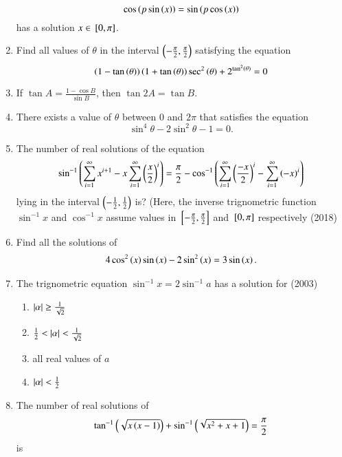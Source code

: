 \begin{enumerate}[label=\thesubsection.\arabic*,ref=\thesubsection.\theenumi]
$$
\cos {\ensuremath{\left(p\sin \left(x\right)\right)}}=\sin {\ensuremath{\left(p\cos \left(x\right)\right)}}
$$
has a solution $ x \in {}\left[0, \pi\right]$.
\item Find all values of $\theta$ in the interval $\left(-\frac{\pi}{2},\frac{\pi}{2}\right)$ satisfying the equation 
\hfill{}
$$
\left(1-\tan \left(\theta\right)\right)\left(1+\tan \left(\theta\right)\right)\sec^2\left(\theta\right)+ 2^{\tan^2\left(\theta\right)}=0
$$
\item If $\tan A = \frac{1-\cos B}{\sin B}$, then $\tan 2A = \tan B$.
\hfill{}
\item There exists a value of $\theta$ between $0$ and $2\pi$ that satisfies the equation
\hfill{}
	$$\sin^{4}\theta -2\sin^{2}\theta-1=0.$$
	\item{
			The number of real solutions of the equation \begin{align*} \sin ^{-1}\left(\sum_{i=1}^{\infty} x^{i+1}-x \sum_{i=1}^{\infty} \left(\frac{x}{2}\right)^i\right) = \frac{\pi}{2} - \cos^{-1}\left(\sum_{i=1}^{\infty}\left(\frac{-x}{2}\right)^i-\sum_{i=1}^{\infty} \left(-x\right)^i\right) \end{align*} lying in the interval $\left(-\frac{1}{2},\frac{1}{2}\right)$ is? (Here, the inverse trignometric function $\sin^{-1}x$ and $\cos^{-1}x$ assume values in ${}\left[-\frac{\pi}{2}, \frac{\pi}{2}\right]$ and ${}\left[0, \pi\right]$ respectively \hfill (2018)
}
\item Find all the solutions of
\hfill {}
\begin{align*}
4\cos ^2\left(x\right)\sin \left(x\right)-2\sin ^2 \left(x\right) = 3\sin \left(x\right).
\end{align*}
	\item{
			The trignometric equation $\sin^{-1} x = 2 \sin^{-1}a$ has a solution for \hfill (2003)
		\begin{multicols}{2}
		\begin{enumerate}
			\item{$\left\vert\alpha\right\vert\geq\frac{1}{\sqrt{2}}$}
			\item{$\frac{1}{2} < \left\vert\alpha\right\vert < \frac{1}{\sqrt{2}}$}
%			
			\item{all real values of $a$}
			\item{$\left\vert\alpha\right\vert < \frac{1}{2}$}
		\end{enumerate}
		\end{multicols}
	}
\item The number of real solutions of
\begin{align*}
\tan ^{-1}\left(\sqrt{x\left(x-1\right)}\right)+\sin ^{-1}\left(\sqrt{x^2+x+1}\right)=\frac{\pi}{2}
\end{align*}
is 

\end{enumerate}
